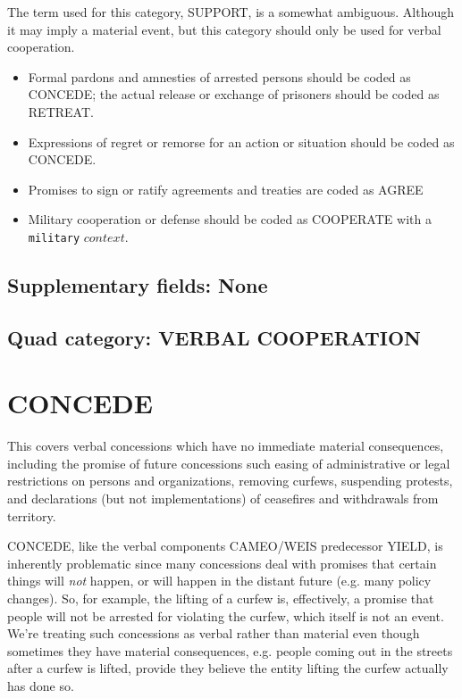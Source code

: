 \documentclass[11pt]{report}
\newcommand{\plcat}[1]{\textsf{#1}}
\newcommand{\ti}[1]{\textit{#1}}
\newcommand{\txt}[1]{\texttt{#1}}
\begin{document}
The term used for this category, \plcat{SUPPORT}, is a somewhat ambiguous. Although it may imply a material event, but this category should only be used for verbal cooperation.

\begin{itemize}
\item Formal pardons and amnesties of arrested persons should be coded as \plcat{CONCEDE}; the actual release  or exchange of prisoners should be coded as \plcat{RETREAT}.

\item Expressions of regret or remorse for an action or situation should be coded as \plcat{CONCEDE}.

\item Promises to sign or ratify agreements and treaties are coded as \plcat{AGREE}

\item Military cooperation or defense should be coded as \plcat{COOPERATE} with a \txt{military} $context.$
\end{itemize}

\subsection{Supplementary fields: None}


\subsection{Quad category: VERBAL COOPERATION}


\newpage

\section{CONCEDE}

This covers verbal concessions which have no immediate material consequences, including the promise of future concessions such easing of administrative or legal restrictions on persons and organizations, removing curfews, suspending protests, and declarations (but not implementations) of ceasefires and withdrawals from territory.

\plcat{CONCEDE}, like the verbal components CAMEO/WEIS predecessor \plcat{YIELD}, is inherently problematic since many concessions deal with promises that certain things will \ti{not} happen, or will happen in the distant future (e.g. many policy changes). So, for example, the lifting of a curfew is, effectively, a promise that people will not be arrested for violating the curfew, which itself is not an event. We're treating such concessions as verbal rather than material even though sometimes they have material consequences, e.g. people coming out in the streets after a curfew is lifted, provide they believe the entity lifting the curfew actually has done so.
\end{document}

